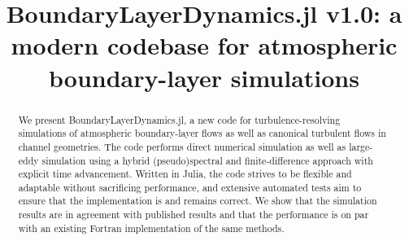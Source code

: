 \documentclass[gmd, manuscript]{copernicus}
\begin{document}
\title{BoundaryLayerDynamics.jl v1.0: a modern codebase for atmospheric boundary-layer simulations}
















\received{}
\pubdiscuss{} %
\revised{}
\accepted{}
\published{}




\maketitle



\begin{abstract}
\noindent
We present BoundaryLayerDynamics.jl, a new code for turbulence-resolving simulations of atmospheric boundary-layer flows as well as canonical turbulent flows in channel geometries.
The code performs direct numerical simulation as well as large-eddy simulation using a hybrid (pseudo)spectral and finite-difference approach with explicit time advancement.
Written in Julia, the code strives to be flexible and adaptable without sacrificing performance, and extensive automated tests aim to ensure that the implementation is and remains correct.
We show that the simulation results are in agreement with published results and that the performance is on par with an existing Fortran implementation of the same methods.
\end{abstract}
\end{document}
